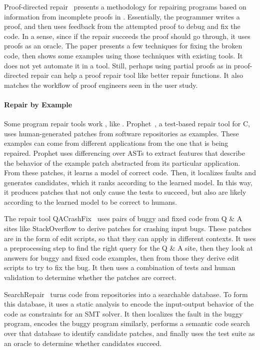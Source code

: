 Proof-directed repair~\cite{dennis2006proof} presents a methodology
for repairing programs based on information from incomplete proofs in .
Essentially, the programmer writes a proof, and then uses feedback
from the attempted proof to debug and fix the code.
In a sense, since if the repair succeeds the proof should go through,
it uses proofs as an oracle. The paper presents a few techniques for fixing the broken code,
then shows some examples using those techniques with existing tools.
It does not yet automate it in a tool.
Still, perhaps using partial proofs as in proof-directed repair can help a proof repair tool like \sysnamelong
better repair functions.
It also matches the workflow of proof engineers seen in the  user study. %

\paragraph{Repair by Example}
Some program repair tools work , like \sysname.
Prophet~\cite{Long:2016:APG:2837614.2837617}, a test-based repair tool for C,
uses human-generated patches from software repositories as examples.
These examples can come from different applications from the one that is being repaired.
Prophet uses differencing over ASTs %
to extract features that describe the behavior of the example patch abstracted from its particular application.
From these patches, it learns a model of correct code. Then,
it localizes faults and generates candidates, which it ranks according to the learned model.
In this way, it produces patches that not only cause the tests to succeed, but also
are likely according to the learned model to be correct to humans.

The repair tool QACrashFix~\cite{gao2015fixing} uses pairs of buggy and fixed code from Q \& A sites like
StackOverflow to derive patches for crashing input bugs. These patches are in the form of edit scripts,
so that they can apply in different contexts. %
It uses a preprocessing step to find the right query for the Q \& A site, then they
look at answers for buggy and fixed code examples, then from those they derive edit scripts to try to fix the bug.
It then uses a combination of tests and human validation to determine whether the patches are correct.

SearchRepair~\cite{Ke:2015:RPS:2916135.2916260} turns code from repositories into a searchable database.
To form this database, it uses a static analysis to encode the input-output behavior of the code as constraints for an SMT solver.
It then localizes the fault in the buggy program,
encodes the buggy program similarly, performs a semantic code search over that database to identify candidate patches,
and finally uses the test suite as an oracle to determine whether candidates succeed.

